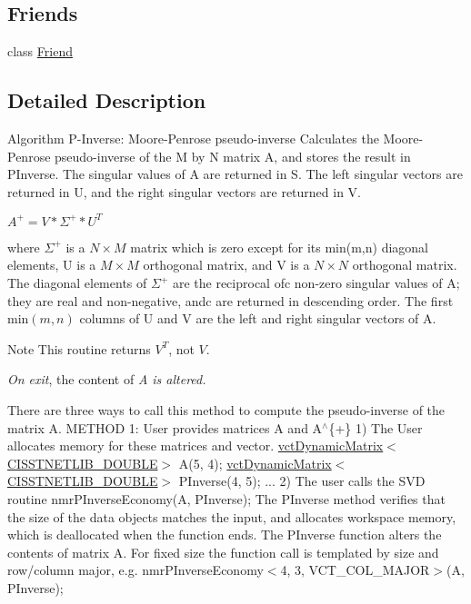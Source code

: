 \subsection*{Friends}
\begin{DoxyCompactItemize}
\item 
class \hyperlink{classnmr_p_inverse_economy_dynamic_data_a7f8321d57e81bc613d5dbef3410ba70e}{Friend}
\end{DoxyCompactItemize}


\subsection{Detailed Description}
Algorithm P-\/\+Inverse\+: Moore-\/\+Penrose pseudo-\/inverse Calculates the Moore-\/\+Penrose pseudo-\/inverse of the M by N matrix A, and stores the result in P\+Inverse. The singular values of A are returned in S. The left singular vectors are returned in U, and the right singular vectors are returned in V.

$ A^{+} = V * \Sigma^{+} * U^{T} $

where $ \Sigma^{+} $ is a $ N \times M $ matrix which is zero except for its min(m,n) diagonal elements, U is a $ M \times M $ orthogonal matrix, and V is a $ N \times N $ orthogonal matrix. The diagonal elements of $ \Sigma^{+} $ are the reciprocal ofc non-\/zero singular values of A; they are real and non-\/negative, andc are returned in descending order. The first $ \mbox{min}(m,n) $ columns of U and V are the left and right singular vectors of A.

\begin{DoxyNote}{Note}
This routine returns $ V^{T} $, not $ V $. 

{\itshape On exit}, the content of {\itshape A is altered.}
\end{DoxyNote}
There are three ways to call this method to compute the pseudo-\/inverse of the matrix A. M\+E\+T\+H\+O\+D 1\+: User provides matrices A and A$^\wedge$\{+\} 1) The User allocates memory for these matrices and vector. \hyperlink{classvct_dynamic_matrix}{vct\+Dynamic\+Matrix$<$\+C\+I\+S\+S\+T\+N\+E\+T\+L\+I\+B\+\_\+\+D\+O\+U\+B\+L\+E$>$} A(5, 4); \hyperlink{classvct_dynamic_matrix}{vct\+Dynamic\+Matrix$<$\+C\+I\+S\+S\+T\+N\+E\+T\+L\+I\+B\+\_\+\+D\+O\+U\+B\+L\+E$>$} P\+Inverse(4, 5); ... 2) The user calls the S\+V\+D routine nmr\+P\+Inverse\+Economy(\+A, P\+Inverse); The P\+Inverse method verifies that the size of the data objects matches the input, and allocates workspace memory, which is deallocated when the function ends. The P\+Inverse function alters the contents of matrix A. For fixed size the function call is templated by size and row/column major, e.\+g. nmr\+P\+Inverse\+Economy$<$4, 3, V\+C\+T\+\_\+\+C\+O\+L\+\_\+\+M\+A\+J\+O\+R$>$(\+A, P\+Inverse);

